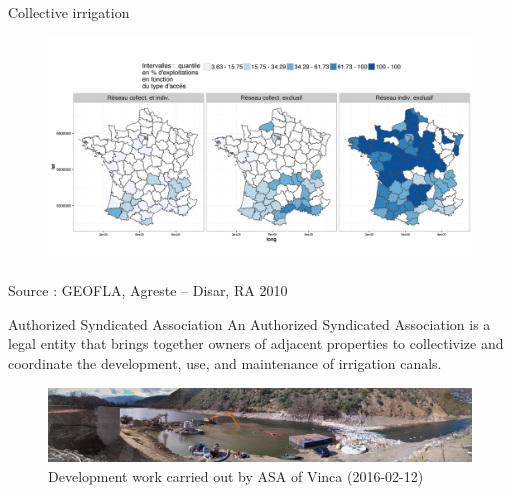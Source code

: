 \documentclass[newPxFont]{beamer}
\begin{document}

\begin{frame}[c]{Collective irrigation}
\vspace{-2em}
\begin{figure}
	\centering
	\includegraphics[width = 1\textwidth]{img/nb_irrigant2}
\end{figure}
\small{Source : GEOFLA, Agreste -- Disar, RA 2010}

\end{frame}


\begin{frame}[c]{Authorized Syndicated Association}
An Authorized Syndicated Association is a legal entity that brings together owners of adjacent properties to collectivize and coordinate the development, use, and maintenance of irrigation canals.
\begin{figure}
	\centering
	\includegraphics[width = 1\textwidth]{img/DSC_0196-PANO}
	\caption{Development work carried out by ASA of Vinca (2016-02-12)}
\end{figure}
\end{frame}

\end{document}
